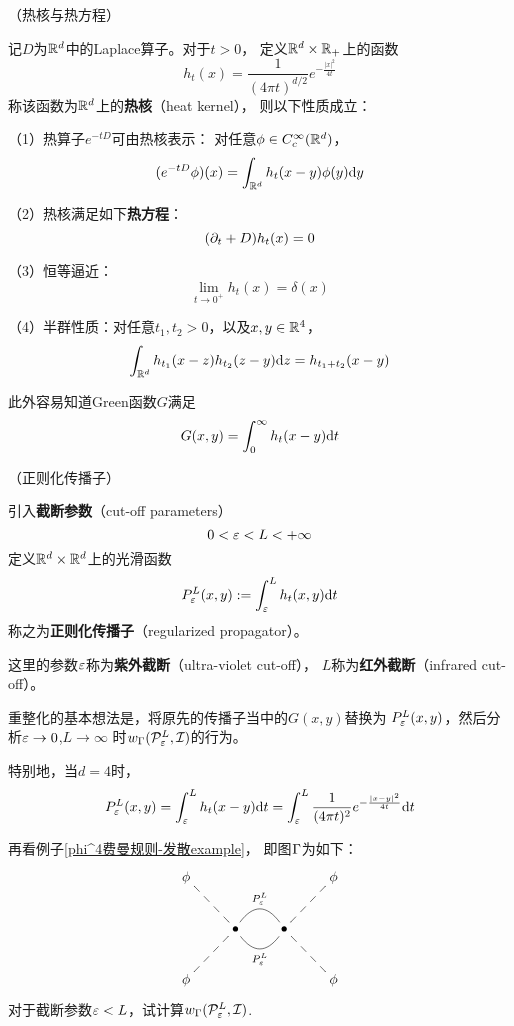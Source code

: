 \begin{lemma}（热核与热方程）

记$D$为$\mathbb{R}^d$中的Laplace算子。对于$t>0$，
定义$\mathbb{R}^d\times\mathbb{R}_+$上的函数
$$h_t(x)=\frac{1}{(4\pi t)^{d/2}}
           e^{-\frac{|x|^2}{4t}}$$
称该函数为$\mathbb{R}^d$上的\textbf{热核}（heat kernel），
则以下性质成立：

（1）热算子$e^{-tD}$可由热核表示：
对任意$\phi\in C_c^\infty(\mathbb{R}^d)$，
$$(e^{-tD}\phi)(x)
=\int_{\mathbb{R}^d}h_t(x-y)\phi(y)\mathrm{d} y$$

（2）热核满足如下\textbf{热方程}：
$$(\partial_t+D)h_t(x)=0$$

（3）恒等逼近：
$$\lim_{t\to 0^+}h_t(x)=\delta(x)$$

（4）半群性质：对任意$t_1,t_2>0$，以及$x,y\in\mathbb{R}^4$，
$$\int_{\mathbb{R}^d}
    h_{t_1}(x-z)h_{t_2}(z-y)\mathrm{d} z
=   h_{t_1+t_2}(x-y)$$
\end{lemma}
此外容易知道Green函数$G$满足
$$G(x,y)=\int_0^\infty h_t(x-y)\mathrm{d} t$$

\begin{notation}（正则化传播子）

引入\textbf{截断参数}（cut-off parameters）
$$0<\varepsilon<L<+\infty$$%
定义$\mathbb{R}^d\times\mathbb{R}^d$上的光滑函数
$$P^L_{\varepsilon}(x,y):=\int_\varepsilon^L h_t(x,y)\mathrm{d} t$$
称之为\textbf{正则化传播子}（regularized propagator）。
\end{notation}

这里的参数$\varepsilon$称为\textbf{紫外截断}（ultra-violet cut-off），
$L$称为\textbf{红外截断}（infrared cut-off）。

重整化的基本想法是，将原先的传播子当中的$G(x,y)$替换为
$P^L_\varepsilon(x,y)$，然后分析$\varepsilon\to 0$,$L\to\infty$
时$w_{\Gamma}(\mathcal{P}_\varepsilon^L,\mathcal{I})$的行为。

特别地，当$d=4$时，
$$
  P^L_\varepsilon(x,y)
=
  \int_\varepsilon^L
    h_t(x-y)\mathrm{d} t
=
  \int_\varepsilon^L
    \frac{1}{(4\pi t)^2}
    e^{-\frac{|x-y|^2}{4t}}
    \mathrm{d} t
$$\vs

\begin{example}再看例子\ref{phi^4费曼规则-发散example}，
即图$\Gamma$为如下：
$$
  \xymatrix{
     \phi          \ar@{--}[rd]
    &&&\phi        \ar@{--}[ld]
  \\
    &\bullet       \ar@{-}@/^1.2pc/[r] ^{P^L_\veps}
                   \ar@{-}@/_1.2pc/[r] _{P^L_\veps}
    &\bullet
    &
  \\
    \phi           \ar@{--}[ru]
    &&&\phi        \ar@{--}[lu]
  }
$$
对于截断参数$\varepsilon<L$，试计算$w_\Gamma(\mathcal{P}^L_\varepsilon,\mathcal{I})$.
\end{example}

